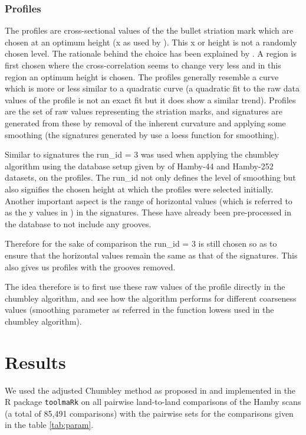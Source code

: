 \documentclass[12pt]{article}
\begin{document}
\subsubsection{Profiles}\label{profiles}

The profiles are cross-sectional values of the the bullet striation mark
which are chosen at an optimum height (x as used by \citet{aoas}). This
x or height is not a randomly chosen level. The rationale behind the
choice has been explained by \citet{aoas}. A region is first chosen
where the cross-correlation seems to change very less and in this region
an optimum height is chosen. The profiles generally resemble a curve
which is more or less similar to a quadratic curve (a quadratic fit to
the raw data values of the profile is not an exact fit but it does show
a similar trend). Profiles are the set of raw values representing the
striation marks, and signatures are generated from these by removal of
the inherent curvature and applying some smoothing (the signatures
generated by \citet{aoas} use a loess function for smoothing).

Similar to signatures the run\_id = 3 was used when applying the
chumbley algorithm using the database setup given by \citet{aoas} of
Hamby-44 and Hamby-252 datasets, on the profiles. The run\_id not only
defines the level of smoothing but also signifies the chosen height at
which the profiles were selected initially. Another important aspect is
the range of horizontal values (which is referred to as the y values in
\citet{aoas}) in the signatures. These have already been pre-processed
in the database to not include any grooves.

Therefore for the sake of comparison the run\_id = 3 is still chosen so
as to ensure that the horizontal values remain the same as that of the
signatures. This also gives us profiles with the grooves removed.

The idea therefore is to first use these raw values of the profile
directly in the chumbley algorithm, and see how the algorithm performs
for different coarseness values (smoothing parameter as referred in the
function lowess used in the chumbley algorithm).

\pagebreak

\section{Results}\label{results}

We used the adjusted Chumbley method as proposed in \citet{hadler} and
implemented in the R package \texttt{toolmaRk} \citep{toolmark} on all
pairwise land-to-land comparisons of the Hamby scans (a total of 85,491
comparisons) with the pairwise sets for the comparisons given in the
table \ref{tab:param}.
\end{document}
